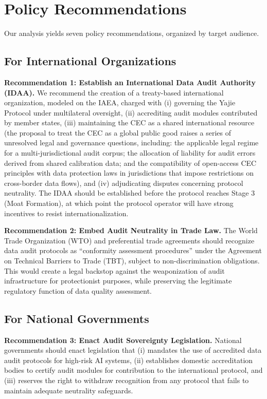 \documentclass[12pt,a4paper]{ctexart}
\theoremstyle{definition}
\theoremstyle{remark}
\begin{document}
\section{Policy Recommendations}

Our analysis yields seven policy recommendations, organized by target audience.

\subsection{For International Organizations}

\textbf{Recommendation 1: Establish an International Data Audit Authority (IDAA).} We recommend the creation of a treaty-based international organization, modeled on the IAEA, charged with (i) governing the Yajie Protocol under multilateral oversight, (ii) accrediting audit modules contributed by member states, (iii) maintaining the CEC as a shared international resource (the proposal to treat the CEC as a global public good raises a series of unresolved legal and governance questions, including: the applicable legal regime for a multi-jurisdictional audit corpus; the allocation of liability for audit errors derived from shared calibration data; and the compatibility of open-access CEC principles with data protection laws in jurisdictions that impose restrictions on cross-border data flows), and (iv) adjudicating disputes concerning protocol neutrality. The IDAA should be established before the protocol reaches Stage 3 (Moat Formation), at which point the protocol operator will have strong incentives to resist internationalization.

\textbf{Recommendation 2: Embed Audit Neutrality in Trade Law.} The World Trade Organization (WTO) and preferential trade agreements should recognize data audit protocols as ``conformity assessment procedures'' under the Agreement on Technical Barriers to Trade (TBT), subject to non-discrimination obligations. This would create a legal backstop against the weaponization of audit infrastructure for protectionist purposes, while preserving the legitimate regulatory function of data quality assessment.

\subsection{For National Governments}

\textbf{Recommendation 3: Enact Audit Sovereignty Legislation.} National governments should enact legislation that (i) mandates the use of accredited data audit protocols for high-risk AI systems, (ii) establishes domestic accreditation bodies to certify audit modules for contribution to the international protocol, and (iii) reserves the right to withdraw recognition from any protocol that fails to maintain adequate neutrality safeguards.
\end{document}

